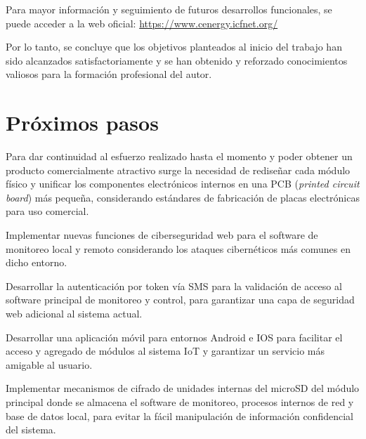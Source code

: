 Para mayor información y seguimiento de futuros desarrollos funcionales, se puede acceder a la web oficial: \url{https://www.cenergy.icfnet.org/}

Por lo tanto, se concluye que los objetivos planteados al inicio del trabajo han sido alcanzados satisfactoriamente y se han obtenido y reforzado conocimientos valiosos para la formación profesional del autor.


\section{Próximos pasos}

Para dar continuidad al esfuerzo realizado hasta el momento y poder obtener un producto comercialmente atractivo surge la necesidad de rediseñar cada módulo físico y unificar los componentes electrónicos internos en una PCB (\emph{printed circuit board}) más pequeña, considerando estándares de fabricación de placas electrónicas para uso comercial.


Implementar nuevas funciones de ciberseguridad web para el software de monitoreo local y remoto considerando los ataques cibernéticos más comunes en dicho entorno.

Desarrollar la autenticación por token vía SMS para la validación de acceso al software principal de monitoreo y control, para garantizar una capa de seguridad web adicional al sistema actual.

Desarrollar una aplicación móvil para entornos Android e IOS para facilitar el acceso y agregado de módulos al sistema IoT y garantizar un servicio más amigable al usuario.

Implementar mecanismos de cifrado de unidades internas del microSD del módulo principal donde se almacena el software de monitoreo, procesos internos de red y base de datos local, para evitar la fácil manipulación de información confidencial del sistema.

